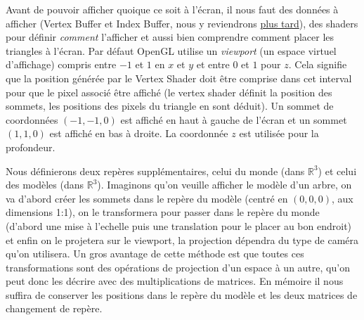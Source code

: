 \documentclass[11pt]{article} %
\begin{document}
Avant de pouvoir afficher quoique ce soit à l'écran, il nous faut des données à afficher (Vertex Buffer et Index Buffer, nous y reviendrons \hyperref[sec:instanced_rendering]{plus tard}), des shaders pour définir \textit{comment} l'afficher et aussi bien comprendre comment placer les triangles à l'écran.
Par défaut OpenGL utilise un \textit{viewport} (un espace virtuel d'affichage) compris entre $-1$ et $1$ en $x$ et $y$ et entre $0$ et $1$ pour $z$. Cela signifie que la position générée par le Vertex Shader doit être comprise dans cet interval pour que le pixel associé être affiché (le vertex shader définit la position des sommets, les positions des pixels du triangle en sont déduit). Un sommet de coordonnées $(-1,-1,0)$ est affiché en haut à gauche de l'écran et un sommet $(1,1,0)$ est affiché en bas à droite. La coordonnée $z$ est utilisée pour la profondeur.
\par
Nous définierons deux repères supplémentaires, celui du monde (dans $\mathbb{R}^3$) et celui des modèles (dans $\mathbb{R}^3$). Imaginons qu'on veuille afficher le modèle d'un arbre, on va d'abord créer les sommets dans le repère du modèle (centré en $(0,0,0)$, aux dimensions 1:1), on le transformera pour passer dans le repère du monde (d'abord une mise à l'echelle puis une translation pour le placer au bon endroit) et enfin on le projetera sur le viewport, la projection dépendra du type de caméra qu'on utilisera.
Un gros avantage de cette méthode est que toutes ces transformations sont des opérations de projection d'un espace à un autre, qu'on peut donc les décrire avec des multiplications de matrices. En mémoire il nous suffira de conserver les positions dans le repère du modèle et les deux matrices de changement de repère.
\end{document}
